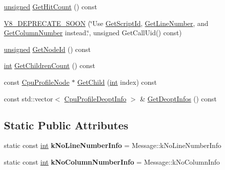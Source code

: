 \begin{DoxyCompactItemize}
\mbox{\hyperlink{classunsigned}{unsigned}} \mbox{\hyperlink{classv8_1_1CpuProfileNode_a56d1cece4ee808022b9eb7f3eb66b93a}{Get\+Hit\+Count}} () const
\item 
\mbox{\hyperlink{classv8_1_1CpuProfileNode_a5285f35c759e2b0afa74f4db0e0bc50c}{V8\+\_\+\+D\+E\+P\+R\+E\+C\+A\+T\+E\+\_\+\+S\+O\+ON}} (\char`\"{}Use \mbox{\hyperlink{classv8_1_1CpuProfileNode_aef0b693911218f14745f2c51b4c9a860}{Get\+Script\+Id}}, \mbox{\hyperlink{classv8_1_1CpuProfileNode_a6616c8d1893da19183d57e6488eb2743}{Get\+Line\+Number}}, and \mbox{\hyperlink{classv8_1_1CpuProfileNode_a9df61090cf365f1f03d5bce44653f1f5}{Get\+Column\+Number}} instead.\char`\"{}, unsigned Get\+Call\+Uid() const)
\item 
\mbox{\hyperlink{classunsigned}{unsigned}} \mbox{\hyperlink{classv8_1_1CpuProfileNode_a67334450071a60ec3c3cfa58777cc006}{Get\+Node\+Id}} () const
\item 
\mbox{\hyperlink{classint}{int}} \mbox{\hyperlink{classv8_1_1CpuProfileNode_afc0f772f6dad49b670c7b9675d27c688}{Get\+Children\+Count}} () const
\item 
const \mbox{\hyperlink{classv8_1_1CpuProfileNode}{Cpu\+Profile\+Node}} $\ast$ \mbox{\hyperlink{classv8_1_1CpuProfileNode_a3564b60d16ee61b1ab71ce179a2f6e92}{Get\+Child}} (\mbox{\hyperlink{classint}{int}} index) const
\item 
const std\+::vector$<$ \mbox{\hyperlink{structv8_1_1CpuProfileDeoptInfo}{Cpu\+Profile\+Deopt\+Info}} $>$ \& \mbox{\hyperlink{classv8_1_1CpuProfileNode_a89b7835d63743c30b59ba3752299f2ce}{Get\+Deopt\+Infos}} () const
\end{DoxyCompactItemize}
\subsection*{Static Public Attributes}
\begin{DoxyCompactItemize}
\item 
\mbox{\label{classv8_1_1CpuProfileNode_ad54213fe8a795cb6669566f0272fc5ba}} 
static const \mbox{\hyperlink{classint}{int}} {\bfseries k\+No\+Line\+Number\+Info} = Message\+::k\+No\+Line\+Number\+Info
\item 
\mbox{\label{classv8_1_1CpuProfileNode_a7c8c1dea3ae0cf4c219b7b1f15a8405b}} 
static const \mbox{\hyperlink{classint}{int}} {\bfseries k\+No\+Column\+Number\+Info} = Message\+::k\+No\+Column\+Info
\end{DoxyCompactItemize}


